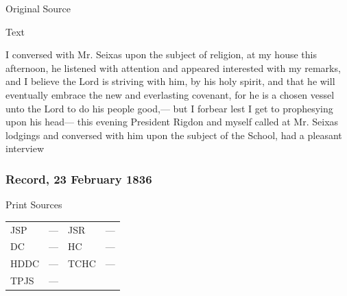				\begin{description}
					\item[Original Source]
				\end{description}
				
				
				\begin{description}
					\item[Text]
				\end{description}
				
					I conversed with Mr. Seixas upon the subject of religion, at my house this afternoon, he listened with attention and appeared interested with my remarks, and I believe the Lord is striving with him, by his holy spirit, and that he will eventually embrace the new and everlasting covenant, for he is a chosen vessel unto the Lord to do his people good,--- but I forbear lest I get to prophesying upon his head--- this evening President Rigdon and myself called at Mr. Seixas lodgings and conversed with him upon the subject of the School, had a pleasant interview
					
		\subsubsection{Record, 23 February 1836}
			\label{EMS-1836-JS-23-FEB-1836}
			
			\begin{description}
					\item[Print Sources]
				\end{description}

					\begin{tabular}{p{0.5in}p{1in}p{0.5in}p{1in}}
					JSP	 	& ---		& JSR 		& --- \\
					DC	 	& ---		& HC 		& --- \\
					HDDC 	& ---		& TCHC 		& --- \\
					TPJS 	& ---		& 	 		&  \\
					\end{tabular}
				
